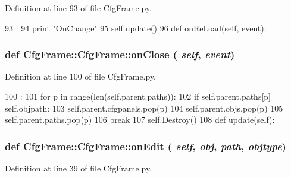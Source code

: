 Definition at line 93 of file CfgFrame.py.


\begin{DoxyCode}
93                              :
94         print "OnChange"
95         self.update()
96         
    def onReLoad(self, event):
\end{DoxyCode}
\hypertarget{classCfgFrame_1_1CfgFrame_a54ab916bfd9fa479de45ed9f3e62bffb}{
\subsubsection[{onClose}]{\setlength{\rightskip}{0pt plus 5cm}def CfgFrame::CfgFrame::onClose ( {\em self}, \/   {\em event})}}
\label{classCfgFrame_1_1CfgFrame_a54ab916bfd9fa479de45ed9f3e62bffb}


Definition at line 100 of file CfgFrame.py.


\begin{DoxyCode}
100                             :
101         for p in range(len(self.parent.paths)):
102             if self.parent.paths[p] == self.objpath:
103                 self.parent.cfgpanels.pop(p)
104                 self.parent.objs.pop(p)
105                 self.parent.paths.pop(p)
106                 break
107         self.Destroy()
108                 
    def update(self):
\end{DoxyCode}
\hypertarget{classCfgFrame_1_1CfgFrame_aa3c4dde8c6f9e2b22e98510c177992de}{
\subsubsection[{onEdit}]{\setlength{\rightskip}{0pt plus 5cm}def CfgFrame::CfgFrame::onEdit ( {\em self}, \/   {\em obj}, \/   {\em path}, \/   {\em objtype})}}
\label{classCfgFrame_1_1CfgFrame_aa3c4dde8c6f9e2b22e98510c177992de}


Definition at line 39 of file CfgFrame.py.


